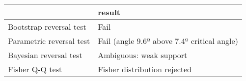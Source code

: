 \begin{tabular}{ll}
\toprule
{} &                                       result \\
\midrule
Bootstrap reversal test  &                                         Fail \\
Parametric reversal test &  Fail (angle 9.6º above 7.4º critical angle) \\
Bayesian reversal test   &                      Ambiguous: weak support \\
Fisher Q-Q test          &                 Fisher distribution rejected \\
\bottomrule
\end{tabular}
